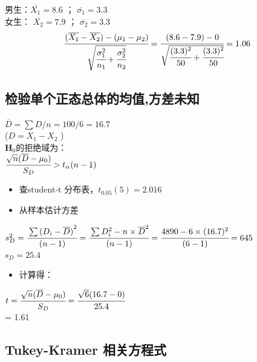 男生：\(\overline{X_1} = 8.6\) ； \(\overline{\sigma_1} = 3.3\)\\
女生： \(\overline{X_2} = 7.9\) ； \(\overline{\sigma_2} = 3.3\)\\

\[\cfrac{ (\overline{X_1} - \overline{X_2}) - ({\mu}_1  - {\mu}_2)}{\sqrt{\cfrac{\sigma_1^2}{n_1} + \cfrac{\sigma_2^2}{n_2}}} = \cfrac{ (8.6 - 7.9) - 0 }{\sqrt{\cfrac{(3.3)^2}{50} + \cfrac{(3.3)^2}{50}}} = 1.06\]

\hypertarget{ux68c0ux9a8cux5355ux4e2aux6b63ux6001ux603bux4f53ux7684ux5747ux503cux65b9ux5deeux672aux77e5-1}{%
\subsection{检验单个正态总体的均值,方差未知}\label{ux68c0ux9a8cux5355ux4e2aux6b63ux6001ux603bux4f53ux7684ux5747ux503cux65b9ux5deeux672aux77e5-1}}

\(\overline{D} = \sum D / n = 100/6 = 16.7\)\\
(\(D = X_1 - X_2\) )\\
\(\mathbf{H}_0\)的拒绝域为：\\
\(\cfrac{ \sqrt{n}(\overline{D} - \mu _0) }{S_D}  > t_\alpha(n-1)\)\\

\begin{itemize}
\tightlist
\item
  查student-t 分布表，\(t_{0.05} (5) = 2.016\)
\item
  从样本估计方差\\
\end{itemize}

\(s_D^2 = \cfrac{\sum {(D_i - \overline{D})}^2  }{(n - 1)}= \cfrac{\sum D_i^2 - n \times \overline{D}^2  }{(n - 1)} = \cfrac{4890 - 6 \times (16.7)^2  }{(6 - 1)} = 645\)\\
\(s_D = 25.4\)\\

\begin{itemize}
\tightlist
\item
  计算得：
\end{itemize}

\(t = \cfrac{ \sqrt{n}(\overline{D} - \mu _0) }{S_D} = \cfrac{ \sqrt{6}(16.7 - 0) }{25.4}\)\\
= 1.61\\




\hypertarget{tukey-kramer-ux76f8ux5173ux65b9ux7a0bux5f0f}{%
\subsection{Tukey-Kramer
相关方程式}\label{tukey-kramer-ux76f8ux5173ux65b9ux7a0bux5f0f}}

